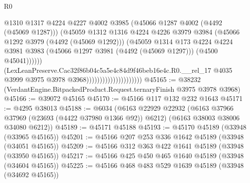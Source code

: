 \begin{lexlean}{R0}
\begin{coremodule}
                                                  @1310
                                                  @1317
                                                  @4224
                                                  @4227
                                                  @4002
                                                  @3985
                                                  (@45066 @1287 @4002 (@4492 (@45069 @1287)))
                                                  (@45059
                                                    @1312
                                                    @1316
                                                    @4224
                                                    @4226
                                                    @3979
                                                    @3984
                                                    (@45066 @1292 @3979 (@4492 (@45069 @1292)))
                                                    (@45059
                                                      @1314
                                                      @173
                                                      @4224
                                                      @4224
                                                      @3981
                                                      @3983
                                                      (@45066 @1297 @3981 (@4492 (@45069 @1297)))
                                                      (@4500 @45041))))))
                                            (LexLeanPreserve.Cac32f86b04c5a5e4c84d9f46beb16e4c.R0.__rel_17
                                              @4035
                                              @3999
                                              @3975
                                              @3978
                                              @3968)))))))))))))))))))))
@45165 := @38232 (VerdantEngine.BitpackedProduct.Request.ternaryFinish @3975 @3978 @3968)
@45166 := @39072 @45165
@45170 := @45166 @117 @132 @232 @1643
@45171 := @4295 @38013
@45188 := @6034
    (@6163
      @22929
      @22932
      (@6163 @37966 @37969 (@23693 (@4422 @37980 @1366 @92)) @6212)
      (@6163 @38003 @38006 @34080 @6212))
@45189 := @45171 @45188
@45193 := @45170 @45189 (@33948 (@33965 @45165))
@45201 := @45166 @207 @253 @336 @1642 @45189 (@33948 (@34051 @45165))
@45209 := @45166 @312 @363 @422 @1641 @45189 (@33948 (@33950 @45165))
@45217 := @45166 @425 @450 @465 @1640 @45189 (@33948 (@34604 @45165))
@45225 := @45166 @468 @483 @529 @1639 @45189 (@33948 (@34692 @45165))

\end{coremodule}
\end{lexlean}
